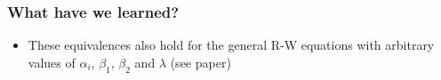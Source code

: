 \begin{frame}[c]
  \frametitle{What have we learned?}

  \begin{center}
    \setlength{\fboxrule}{1pt}
  \end{center}
  \begin{itemize}
  \item[\hand] These equivalences also hold for the general R-W equations with arbitrary values of $\alpha_i$, $\beta_1$, $\beta_2$ and $\lambda$ (see paper)
  \end{itemize}
  
\end{frame}

